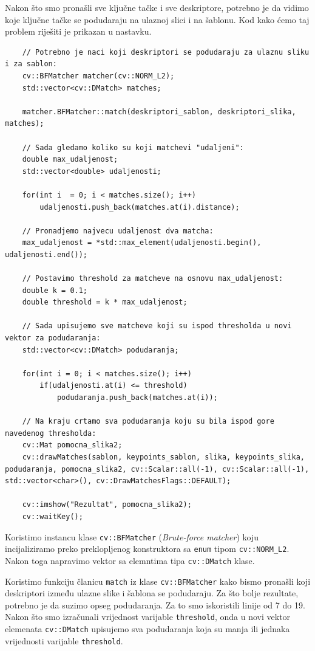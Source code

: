 \documentclass[a4paper, 12pt]{article}
\begin{document}
Nakon što smo pronašli sve ključne tačke i sve deskriptore, potrebno je da vidimo koje ključne tačke se podudaraju na ulaznoj slici i na šablonu. Kod kako ćemo taj problem riješiti je prikazan u nastavku.

\begin{lstlisting}
    // Potrebno je naci koji deskriptori se podudaraju za ulaznu sliku i za sablon:
    cv::BFMatcher matcher(cv::NORM_L2);
    std::vector<cv::DMatch> matches;

    matcher.BFMatcher::match(deskriptori_sablon, deskriptori_slika, matches);

    // Sada gledamo koliko su koji matchevi "udaljeni":
    double max_udaljenost;
    std::vector<double> udaljenosti;

    for(int i  = 0; i < matches.size(); i++)
        udaljenosti.push_back(matches.at(i).distance);

    // Pronadjemo najvecu udaljenost dva matcha:
    max_udaljenost = *std::max_element(udaljenosti.begin(), udaljenosti.end());

    // Postavimo threshold za matcheve na osnovu max_udaljenost:
    double k = 0.1;
    double threshold = k * max_udaljenost;

    // Sada upisujemo sve matcheve koji su ispod thresholda u novi vektor za podudaranja:
    std::vector<cv::DMatch> podudaranja;

    for(int i = 0; i < matches.size(); i++)
        if(udaljenosti.at(i) <= threshold)
            podudaranja.push_back(matches.at(i));

    // Na kraju crtamo sva podudaranja koju su bila ispod gore navedenog thresholda:
    cv::Mat pomocna_slika2;
    cv::drawMatches(sablon, keypoints_sablon, slika, keypoints_slika, podudaranja, pomocna_slika2, cv::Scalar::all(-1), cv::Scalar::all(-1), std::vector<char>(), cv::DrawMatchesFlags::DEFAULT);

    cv::imshow("Rezultat", pomocna_slika2);
    cv::waitKey();
\end{lstlisting}

Koristimo instancu klase \lstinline{cv::BFMatcher} (\textit{Brute-force matcher}) koju incijaliziramo preko preklopljenog konstruktora sa \lstinline{enum} tipom \lstinline{cv::NORM_L2}. Nakon toga napravimo vektor sa elemntima tipa \lstinline{cv::DMatch} klase.

Koristimo funkciju članicu \lstinline{match} iz klase \lstinline{cv::BFMatcher} kako bismo pronašli koji deskriptori između ulazne slike i šablona se podudaraju. Za što bolje rezultate, potrebno je da suzimo opseg podudaranja. Za to smo iskoristili linije od 7 do 19. Nakon što smo izračunali vrijednost varijable \lstinline{threshold}, onda u novi vektor elemenata \lstinline{cv::DMatch} upisujemo sva podudaranja koja su manja ili jednaka vrijednosti varijable \lstinline{threshold}. 
\end{document}
